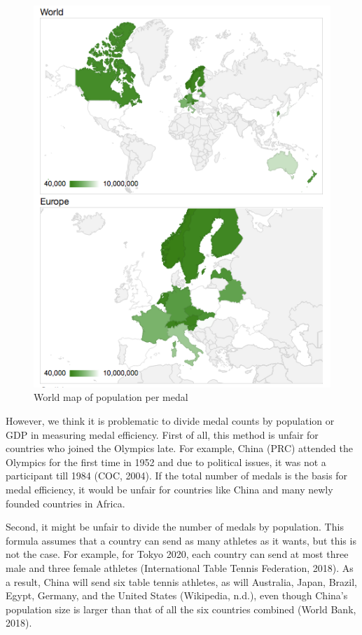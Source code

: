 \documentclass[
]{article}
\begin{document}
\begin{figure}

{\centering \includegraphics[width=0.7\linewidth]{static/pics/3-6} 

}

\caption{World map of population per medal}\label{fig:figure09}
\end{figure}

However, we think it is problematic to divide medal counts by population or GDP in measuring medal efficiency. First of all, this method is unfair for countries who joined the Olympics late. For example, China (PRC) attended the Olympics for the first time in 1952 and due to political issues, it was not a participant till 1984 (COC, 2004). If the total number of medals is the basis for medal efficiency, it would be unfair for countries like China and many newly founded countries in Africa.

Second, it might be unfair to divide the number of medals by population. This formula assumes that a country can send as many athletes as it wants, but this is not the case. For example, for Tokyo 2020, each country can send at most three male and three female athletes (International Table Tennis Federation, 2018). As a result, China will send six table tennis athletes, as will Australia, Japan, Brazil, Egypt, Germany, and the United States (Wikipedia, n.d.), even though China's population size is larger than that of all the six countries combined (World Bank, 2018).
\end{document}
